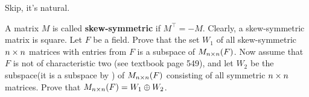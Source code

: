 \begin{exercise} \label{exercise 1.3.27}
Skip, it's natural.
\end{exercise}

\begin{exercise} \label{exercise 1.3.28}
A matrix \(M\) is called \textbf{skew-symmetric} if \(M^\top = -M\).
Clearly, a skew-symmetric matrix is square.
Let \(F\) be a field.
Prove that the set \(W_1\) of all skew-symmetric \(n \times n\) matrices with entries from \(F\) is a subspace of \(M_{n \times n}(F)\).
Now assume that \(F\) is not of characteristic two (see textbook page 549), and let \(W_2\) be the subspace(it is a subspace by ) of \(M_{n \times n}(F)\) consisting of all symmetric \(n \times n\) matrices.
Prove that \(M_{n \times n}(F) = W_1 \oplus W_2\).
\end{exercise}


